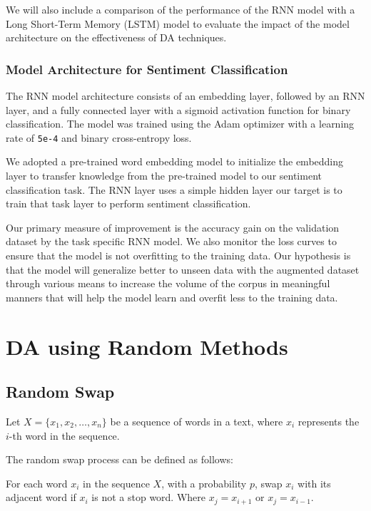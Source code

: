 \documentclass{article}
\newcommand{\code}[1]{\texttt{#1}}
\begin{document}
We will also include a comparison of the performance of the RNN model with a
Long Short-Term Memory (LSTM) model to evaluate the impact of the model
architecture on the effectiveness of DA techniques.

\subsubsection{Model Architecture for Sentiment Classification}

The RNN model architecture consists of an embedding layer, followed by an RNN
layer, and a fully connected layer with a sigmoid activation function for
binary classification. The model was trained using the Adam optimizer with a
learning rate of \code{5e-4} and binary cross-entropy loss.

We adopted a pre-trained word embedding model to initialize the embedding layer
to transfer knowledge from the pre-trained model to our sentiment
classification task. The RNN layer uses a simple hidden layer our target is to
train that task layer to perform sentiment classification.

Our primary measure of improvement is the accuracy gain on the validation
dataset by the task specific RNN model. We also monitor the loss curves to
ensure that the model is not overfitting to the training data. Our hypothesis
is that the model will generalize better to unseen data with the augmented
dataset through various means to increase the volume of the corpus in
meaningful manners that will help the model learn and overfit less to the
training data.

\section{DA using Random Methods}

\subsection{Random Swap}

Let \( X = \{x_1, x_2, \ldots, x_n\} \) be a sequence of words in a text, where \( x_i \) represents the \( i \)-th word in the sequence.

The random swap process can be defined as follows:

For each word \( x_i \) in the sequence \( X \), with a probability \( p \), swap \( x_i \) with its adjacent word if \( x_i \) is not a stop word. Where \( x_j = x_{i+1} \) or \( x_j = x_{i-1} \).
\end{document}
